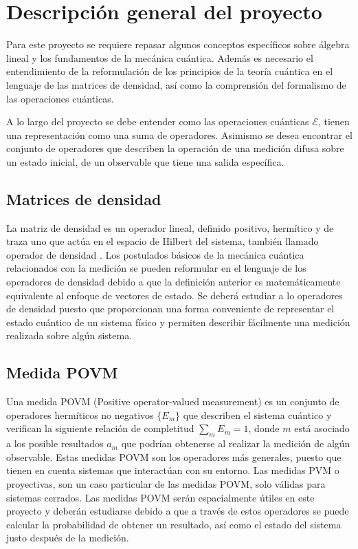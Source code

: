 \section{Descripción general del proyecto}



Para este proyecto se requiere repasar algunos conceptos específicos sobre álgebra lineal y los fundamentos de la mecánica cuántica. Además es necesario el entendimiento de la reformulación de los principios de la teoría cuántica en el lenguaje de las matrices de densidad, así como la comprensión del formalismo de las operaciones cuánticas.


 A lo largo del proyecto se debe entender como las operaciones cuánticas $\mathcal{E}$, tienen una representación como una suma de operadores. Asimismo se desea encontrar el conjunto de operadores que describen la operación de una medición difusa sobre un estado inicial, de un observable que tiene una salida específica.
 



\subsection{Matrices de densidad}

La matriz de densidad es un operador lineal, definido positivo, hermítico y de traza uno que actúa en el espacio de Hilbert del sistema, también llamado operador de densidad \cite{nielsen_chuang_2010}. Los postulados básicos de la mecánica cuántica relacionados con la medición se pueden reformular en el lenguaje de los operadores de densidad debido a que la definición anterior es matemáticamente equivalente al enfoque de vectores de estado. Se deberá estudiar a lo operadores de densidad puesto que proporcionan una forma conveniente de representar el estado cuántico de un sistema físico y permiten describir fácilmente una medición realizada sobre algún sistema.


\subsection{Medida POVM }


Una medida POVM (Positive operator-valued measurement) es un conjunto de operadores hermíticos no negativos $\{E_{m}\}$  que describen el sistema cuántico y verifican la siguiente relación de completitud $\sum _{m}E_{m}=1$, donde $m$ está asociado a los posible resultados $a_m$ que podrían obtenerse al realizar la medición de algún observable. Estas medidas POVM son los operadores más generales, puesto que tienen en cuenta  sistemas que interactúan con su entorno. Las medidas PVM o proyectivas, son un caso particular de las medidas POVM, solo válidas para sistemas cerrados. Las medidas POVM serán espacialmente útiles en este proyecto y deberán estudiarse debido a que a través de estos operadores se puede calcular la probabilidad de obtener un resultado, así como el estado del sistema justo después de la medición.
 


